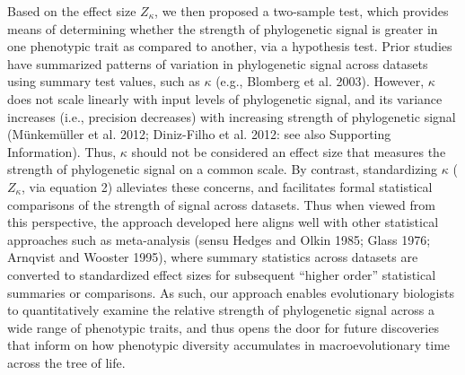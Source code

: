 \documentclass[]{article}
\begin{document}
Based on the effect size \(Z_\kappa\), we then proposed a two-sample
test, which provides means of determining whether the strength of
phylogenetic signal is greater in one phenotypic trait as compared to
another, via a hypothesis test. Prior studies have summarized patterns
of variation in phylogenetic signal across datasets using summary test
values, such as \(\kappa\) (e.g., Blomberg et al. 2003). However,
\(\kappa\) does not scale linearly with input levels of phylogenetic
signal, and its variance increases (i.e., precision decreases) with
increasing strength of phylogenetic signal (Münkemüller et al. 2012;
Diniz-Filho et al. 2012: see also Supporting Information). Thus,
\(\kappa\) should not be considered an effect size that measures the
strength of phylogenetic signal on a common scale. By contrast,
standardizing \(\kappa\) (\(Z_\kappa\), via equation 2) alleviates these
concerns, and facilitates formal statistical comparisons of the strength
of signal across datasets. Thus when viewed from this perspective, the
approach developed here aligns well with other statistical approaches
such as meta-analysis (sensu Hedges and Olkin 1985; Glass 1976; Arnqvist
and Wooster 1995), where summary statistics across datasets are
converted to standardized effect sizes for subsequent ``higher order''
statistical summaries or comparisons. As such, our approach enables
evolutionary biologists to quantitatively examine the relative strength
of phylogenetic signal across a wide range of phenotypic traits, and
thus opens the door for future discoveries that inform on how phenotypic
diversity accumulates in macroevolutionary time across the tree of life.
\hfill\break
\end{document}
